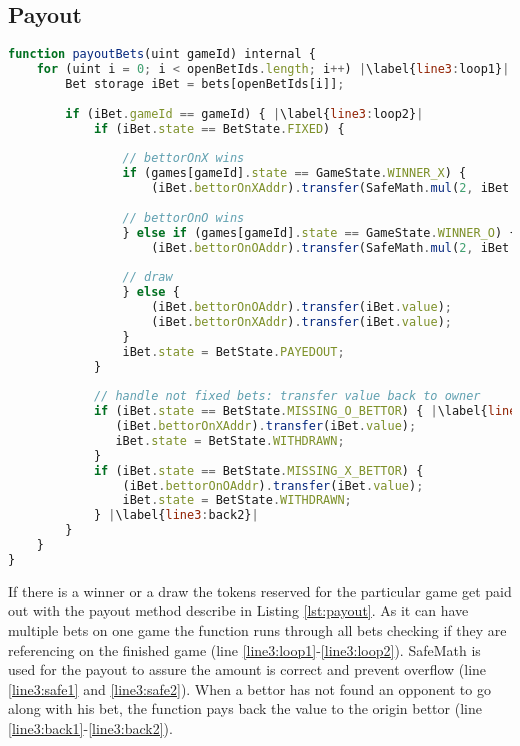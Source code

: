 \subsection{Payout}\label{subsec:payout}
\begin{lstlisting}[caption={Payout Function on the Smart Contract}, label={lst:payout},language=JavaScript,escapechar=|]
function payoutBets(uint gameId) internal {
	for (uint i = 0; i < openBetIds.length; i++) |\label{line3:loop1}|
		Bet storage iBet = bets[openBetIds[i]];
   
		if (iBet.gameId == gameId) { |\label{line3:loop2}|
			if (iBet.state == BetState.FIXED) {
   
				// bettorOnX wins
				if (games[gameId].state == GameState.WINNER_X) {
					(iBet.bettorOnXAddr).transfer(SafeMath.mul(2, iBet.value)); |\label{line3:safe1}|
   
				// bettorOnO wins
				} else if (games[gameId].state == GameState.WINNER_O) {
					(iBet.bettorOnOAddr).transfer(SafeMath.mul(2, iBet.value)); |\label{line3:safe2}|
   
				// draw
				} else {
					(iBet.bettorOnOAddr).transfer(iBet.value);
					(iBet.bettorOnXAddr).transfer(iBet.value);
				}
				iBet.state = BetState.PAYEDOUT;
			}
   
			// handle not fixed bets: transfer value back to owner
			if (iBet.state == BetState.MISSING_O_BETTOR) { |\label{line3:back1}|
			   (iBet.bettorOnXAddr).transfer(iBet.value);
			   iBet.state = BetState.WITHDRAWN;
			}
			if (iBet.state == BetState.MISSING_X_BETTOR) {
				(iBet.bettorOnOAddr).transfer(iBet.value);
				iBet.state = BetState.WITHDRAWN;
			} |\label{line3:back2}|
		}
	}
}
\end{lstlisting}
If there is a winner or a draw the tokens reserved for the particular game get paid out with the payout method describe in Listing \ref{lst:payout}. As it can have multiple bets on one game the function runs through all bets checking if they are referencing on the finished game (line \ref{line3:loop1}-\ref{line3:loop2}). SafeMath is used for the payout to assure the amount is correct and prevent overflow (line \ref{line3:safe1} and \ref{line3:safe2}). When a bettor has not found an opponent to go along with his bet, the function pays back the value to the origin bettor (line \ref{line3:back1}-\ref{line3:back2}). 